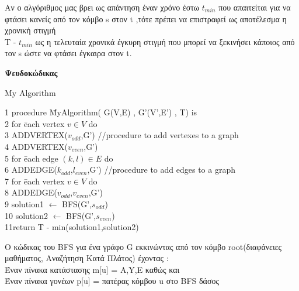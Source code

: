 \documentclass[12pt,a4paper]{article}
\begin{document}
\par
Αν ο αλγόριθμος μας βρει ως απάντηση έναν χρόνο έστω $t_{min}$ που απαιτείται για να φτάσει κανείς από τον κόμβο s στον t ,τότε πρέπει να επιστραφεί ως αποτέλεσμα η χρονική στιγμή \\ 
Τ - $t_{min}$ ως η τελευταία χρονικά έγκυρη στιγμή που μπορεί να ξεκινήσει κάποιος από τον s ώστε 
να φτάσει έγκαιρα στον t.
\begin{center}
    \textbf{Ψευδοκώδικας}
\end{center}

\begin{mybox}[colback=white]{My Algorithm}
\begin{tabbing}
1 procedure \= MyAlgorithm( G(V,E) , G'(V',E') , T) is \\
2 \>for \= each vertex $v \in V$ do \\
3 \>\> ADDVERTEX($v_{odd}$,G')                      //procedure to add vertexes to a graph \\
4 \>\> ADDVERTEX($v_{even}$,G')\\
5 \>for \= each edge $(k,l) \in E$ do\\
6 \>\> ADDEDGE($k_{odd}$,$l_{even}$,G')             //procedure to add edges to a graph \\
7 \>for \= each vertex $v \in V$ do \\
8 \>\> ADDEDGE($v_{odd}$,$v_{even}$,G') \\
9 \>solution1 $\leftarrow$ BFS(G',$s_{odd}$) \\
10 \>solution2 $\leftarrow$ BFS(G',$s_{even}$) \\
11\>return Τ - min(solution1,solution2)
\end{tabbing}
\end{mybox}
O κώδικας του BFS για ένα γράφο G εκκινώντας από τον κόμβο root(διαφάνειες μαθήματος, Αναζήτηση Κατά Πλάτος) έχοντας :\\Έναν πίνακα κατάστασης m[u] = {A,Y,E} καθώς και \\Έναν πίνακα γονέων p[u] = πατέρας κόμβου u στο BFS δάσος  \\
\end{document}
